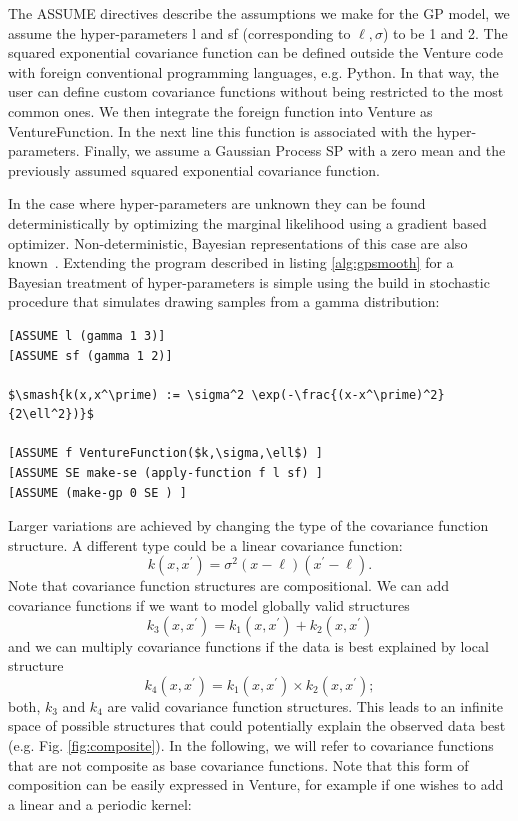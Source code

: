 \documentclass{article} %
\begin{document}
The ASSUME directives describe the assumptions we make for the GP model, we assume the hyper-parameters l and sf (corresponding to $\ell,\sigma$) to be 1 and 2. The squared exponential covariance function can be defined outside the Venture code with foreign conventional programming languages, e.g. Python. In that way, the user can define custom covariance functions without being restricted to the most common ones. We then integrate the foreign function into Venture as VentureFunction. In the next line this function is associated with the hyper-parameters. Finally, we assume a Gaussian Process SP with a zero mean and the previously assumed squared exponential covariance function.





In the case where hyper-parameters are unknown they can be found deterministically by optimizing the marginal likelihood using a gradient based optimizer. Non-deterministic, Bayesian representations of this case are also known~\citep{neal1997monte}. Extending the program described in listing \ref{alg:gpsmooth} for a Bayesian treatment of hyper-parameters is simple using the build in stochastic procedure that simulates drawing samples from a gamma distribution:

\begin{minipage}{\linewidth}
\begin{lstlisting}[frame=single,label=alg:gpNeal,caption=Bayesian GP Smoothing,mathescape]
[ASSUME l (gamma 1 3)]
[ASSUME sf (gamma 1 2)]

$\smash{k(x,x^\prime) := \sigma^2 \exp(-\frac{(x-x^\prime)^2}{2\ell^2})}$

[ASSUME f VentureFunction($k,\sigma,\ell$) ]
[ASSUME SE make-se (apply-function f l sf) ]
[ASSUME (make-gp 0 SE ) ]
\end{lstlisting}
\end{minipage}


Larger variations are achieved by changing the type of the covariance function structure. A different type could be a linear covariance function:
\begin{equation}
 k(x,x^\prime) = \sigma^2 (x-\ell) (x^\prime-\ell). 
\end{equation}
Note that covariance function structures are compositional. We can add covariance functions if we want to model globally valid structures
\begin{equation}
k_3(x,x^\prime) = k_1(x,x^\prime) + k_2(x,x^\prime)
\end{equation}
 and we can multiply covariance functions if the data is best explained by local structure 
\begin{equation}
k_4(x,x^\prime) = k_1(x,x^\prime) \times k_2(x,x^\prime);
\end{equation}
both, $k_3$ and $k_4$ are valid covariance function structures. This leads to an infinite space of possible structures that could potentially explain the observed data best (e.g. Fig. \ref{fig:composite}). In the following, we will refer to covariance functions that are not composite as base covariance functions. Note that this form of composition can be easily expressed in Venture, for example if one wishes to add a linear and a periodic kernel:
\end{document}
